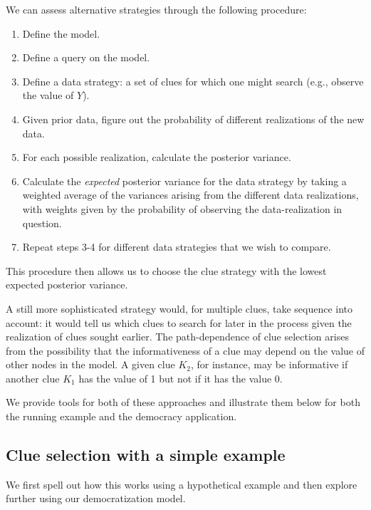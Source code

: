\documentclass[
  12pt,
]{book}
\providecommand{\tightlist}{%
  \setlength{\itemsep}{0pt}\setlength{\parskip}{0pt}}
\begin{document}
We can assess alternative strategies through the following procedure:

\begin{enumerate}
\def\labelenumi{\arabic{enumi}.}
\tightlist
\item
  Define the model.
\item
  Define a query on the model.
\item
  Define a data strategy: a set of clues for which one might search (e.g., observe the value of \(Y\)).
\item
  Given prior data, figure out the probability of different realizations of the new data.
\item
  For each possible realization, calculate the posterior variance.
\item
  Calculate the \emph{expected} posterior variance for the data strategy by taking a weighted average of the variances arising from the different data realizations, with weights given by the probability of observing the data-realization in question.
\item
  Repeat steps 3-4 for different data strategies that we wish to compare.
\end{enumerate}

This procedure then allows us to choose the clue strategy with the lowest expected posterior variance.

A still more sophisticated strategy would, for multiple clues, take sequence into account: it would tell us which clues to search for later in the process given the realization of clues sought earlier. The path-dependence of clue selection arises from the possibility that the informativeness of a clue may depend on the value of other nodes in the model. A given clue \(K_2\), for instance, may be informative if another clue \(K_1\) has the value of 1 but not if it has the value 0.

We provide tools for both of these approaches and illustrate them below for both the running example and the democracy application.

\hypertarget{clue-selection-with-a-simple-example}{%
\subsection{Clue selection with a simple example}\label{clue-selection-with-a-simple-example}}

We first spell out how this works using a hypothetical example and then explore further using our democratization model.
\end{document}
